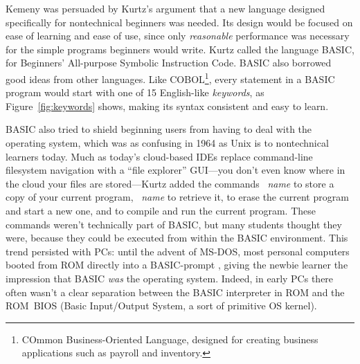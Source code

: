 Kemeny was persuaded by Kurtz's argument that a new language 
designed specifically for nontechnical beginners was needed.
Its design would be focused on ease of learning
and ease of use, since only \emph{reasonable} performance was necessary
for the simple programs beginners would write.
Kurtz called the language BASIC, for Beginners' All-purpose Symbolic
Instruction Code.
BASIC also  borrowed good ideas from other languages.
Like COBOL\footnote{COmmon Business-Oriented Language, designed for creating
business applications such as payroll and inventory.}, every statement in a BASIC
program would start with one of 15 English-like \emph{keywords}, as Figure~\ref{fig:keywords} shows,
making its syntax consistent and easy
to learn.


BASIC also tried to shield beginning users from having to deal with the
operating system, which was as confusing in 1964 as Unix is to
nontechnical learners today.
Much as today's cloud-based IDEs replace command-line filesystem
navigation with a ``file explorer'' GUI---you don't even know where in
the cloud your files are stored---Kurtz added the commands
~\emph{name} to store a copy of your current program,
~\emph{name} to retrieve it,  to erase the current program
and start a new one, and  to compile and run the current program.
These commands weren't technically part of BASIC, but many students
thought they were, because they could be executed from within the BASIC
environment.  This trend persisted with PCs: until the advent of MS-DOS,
most personal computers booted from ROM
directly into a BASIC-prompt , giving the
newbie learner the impression that BASIC \emph{was} the operating
system.  Indeed, in early PCs there often wasn't a clear
separation between the BASIC interpreter in ROM and the ROM~BIOS (Basic
Input/Output System, a sort of primitive OS kernel).

